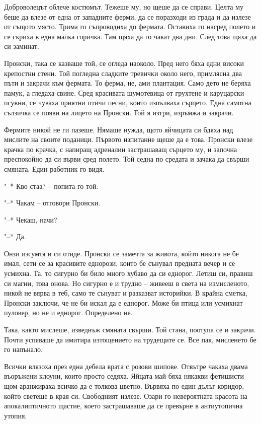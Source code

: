 \documentclass[ebook,openany,12pt]{memoir}
\begin{document}
Доброволецът облече костюмът. Тежеше му, но щеше да се справи. Целта му беше да влезе от една от западните ферми, да се поразходи из града и да излезе от същото място. Трима го съпроводиха до фермата. Оставиха го насред полето и се скриха в една малка горичка. Там щяха да го чакат два дни. След това щяха да си заминат.

Пронски, така се казваше той, се огледа наоколо. Пред него бяха едни високи крепостни стени. Той погледна сладките тревички около него, примлясна два пъти и закрачи към фермата. То ферма, не, ами плантация. Само дето не беряха памук, а гледаха свине. Сред красивата шумотевица от грухтене и каруцарски псувни, се чуваха приятни птичи песни, които изпълваха сърцето. Една самотна сълзичка се появи на лицето на Пронски. Той я изтри, изръмжа и закрачи.

Фермите никой не ги пазеше. Нямаше нужда, щото яйчицата си бдяха над мислите на своите поданици. Първото изпитание щеше да е това. Пронски влезе крачка по крачка, с напиращ адреналин застрашаващ сърцето му, и започна преспокойно да си върви сред полето. Той седна по средата и зачака да свърши смяната. Един работник го видя.

"--* Кво стаа? – попита го той.

"--* Чакам – отговори Пронски.

"--* Чекаш, начи?

"--* Да.

Онзи изсумтя и си отиде. Пронски се замечта за живота, който никога не бе имал, сети се за красивите еднорози, които бе сънувал предната вечер и се усмихна. Та, то сигурно би било много хубаво да си еднорог. Летиш си, правиш си магии, това онова. Но сигурно е и трудно -- живееш в света на измисленото, никой не вярва в теб, само те сънуват и разказват историйки. В крайна сметка, Пронски заключи, че не би искал да е еднорог. Може би птица или усмихнат пуловер, но не и еднорог. Определено не.

Така, както мислеше, изведнъж смяната свърши. Той стана, поотупа се и закрачи. Почти успяваше да имитира изтощението на трудещите се. Все пак, мисленето бе го напънало. 

Всички влязоха през една дебела врата с розови шипове. Отвътре чакаха двама въоръжени клоуни, които просто седяха. Яйцата май бяха някакви фетишисти щом аранжираха всичко да е толкова цветно. Вървяха по един дълъг коридор, който светеше в края си. Свободният излезе. Озари го невероятната красота на апокалиптичното щастие, което застрашаваше да се превърне в антиутопична утопия.
\end{document}

